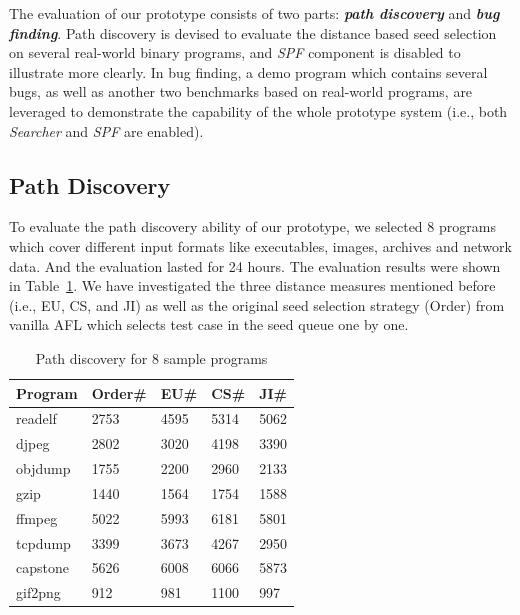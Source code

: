 The evaluation of our prototype consists of two parts: \textbf{\emph{path discovery}} and \textbf{\emph{bug finding}}. 
 Path discovery is devised to evaluate the distance based seed selection on several real-world binary programs, and \textit{SPF} component is disabled to illustrate more clearly. 
 In bug finding, a demo program which contains several bugs, as well as another two benchmarks based on real-world programs, are leveraged to demonstrate the capability of the whole prototype system (i.e., both \textit{Searcher} and \textit{SPF} are enabled).


\subsection{Path Discovery}
To evaluate the path discovery ability of our prototype, we selected 8 programs which cover different input formats like executables, images, archives and network data. And the evaluation lasted for 24 hours.
The evaluation results were shown in Table~\ref{PD-8samples}. We have investigated the three distance measures mentioned before (i.e., EU, CS, and JI) as well as the original seed selection strategy (Order) from vanilla AFL which selects test case in the seed queue one by one.

\begin{table}
  \caption{\label{PD-8samples}Path discovery for 8 sample programs}
  \centering
	\begin{tabular}{p{2cm}<{\centering} p{1.5cm}<{\centering} p{1.5cm}<{\centering} p{1.5cm}<{\centering} p{1.5cm}<{\centering}}
		\toprule
		Program  & Order\# & EU\# & CS\# & JI\# \\ 
		\midrule
		readelf  &    2753 & 4595 & 5314 & 5062 \\
		 djpeg   &    2802 & 3020 & 4198 & 3390 \\
		objdump  &    1755 & 2200 & 2960 & 2133 \\
		  gzip   &    1440 & 1564 & 1754 & 1588 \\
		 ffmpeg  &    5022 & 5993 & 6181 & 5801 \\
		tcpdump  &    3399 & 3673 & 4267 & 2950 \\
		capstone &    5626 & 6008 & 6066 & 5873 \\
		gif2png  &     912 &  981 & 1100 &  997 \\ 
		\bottomrule
	\end{tabular}
\end{table}

